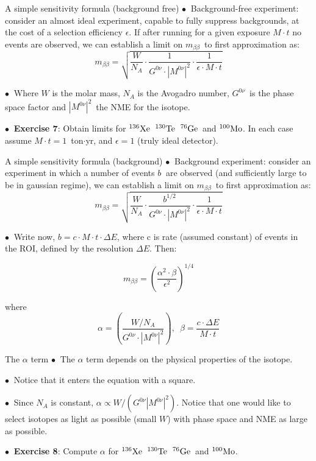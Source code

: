 \documentclass [aspectratio=169]{beamer}
\newcommand{\mbb}{\ensuremath{m_{\beta\beta}}}
\newcommand{\gonu}{\ensuremath{G^{0\nu}}}
\newcommand{\monu}{\ensuremath{|M^{0\nu}|^2}}
\newcommand{\XE}{\ensuremath{{}^{136}{\rm Xe}}}
\newcommand{\GE}{\ensuremath{{}^{76}{\rm Ge}}}
\newcommand{\TE}{\ensuremath{{}^{130}{\rm Te}}}
\newcommand{\MO}{\ensuremath{{}^{100}{\rm Mo}}}
\begin{document}
\begin{frame}{A simple sensitivity formula (background free)}
$\bullet~$ Background-free experiment: consider an almost ideal experiment, capable to fully suppress backgrounds, at the cost of a selection efficiency $\epsilon$. If after running for a given exposure $M \cdot t$ no events are observed, we can establish a limit on \mbb\, to first approximation as:
\[
\mbb = \sqrt{\frac{W}{N_A}\cdot \frac{1}{\gonu\cdot\monu}\cdot \frac{1}{\epsilon\cdot M \cdot t}}
\]

$\bullet~$ Where $W$ is the molar mass, $N_A$ is the Avogadro number, \gonu\ is the phase space factor and \monu\ the NME for the isotope. 

$\bullet~$ {\bf Exercise 7}: Obtain limits for \XE\, \TE\, \GE\ and \MO. In each case assume
$M \cdot t = 1$~ton$\cdot$yr, and $\epsilon =1$ (truly ideal detector). 
\end{frame}


\begin{frame}{A simple sensitivity formula (background)}
$\bullet~$ Background experiment: consider an experiment in which a number of events $b~$ are observed (and sufficiently large to be in gaussian regime), we can establish a limit on \mbb\, to first approximation as:
\[
\mbb = \sqrt{\frac{W}{N_A}\cdot \frac{b^{1/2}}{\gonu\cdot\monu}\cdot \frac{1}{\epsilon\cdot M \cdot t}}
\]

$\bullet~$ Write now, $b = c \cdot M \cdot t \cdot \Delta E$, where c is rate (assumed constant) of events in the ROI, defined by the resolution $\Delta E$. Then: 

\[
\mbb = (\frac{\alpha^2 \cdot \beta}{\epsilon^2})^{1/4}
\]

where
\[
\alpha = (\frac{W/N_A}{\gonu\cdot\monu}), \, \, \, \beta = \frac{c\cdot \Delta E}{M\cdot t}
\]
\end{frame}


\begin{frame}{The $\alpha$ term}
$\bullet~$ The $\alpha$ term depends on the physical properties of the isotope.

 $\bullet~$ Notice that it enters the equation with a square.
 
 $\bullet~$ Since $N_A$ is constant, $\alpha \propto W/(\gonu\monu)$. Notice that one would like to select isotopes as light as possible (small $W$) with phase space and NME as large as possible. 
 
 $\bullet~$ {\bf Exercise 8}: Compute $\alpha$ for \XE\, \TE\, \GE\ and \MO. 
 \end{frame}
 
\end{document}
